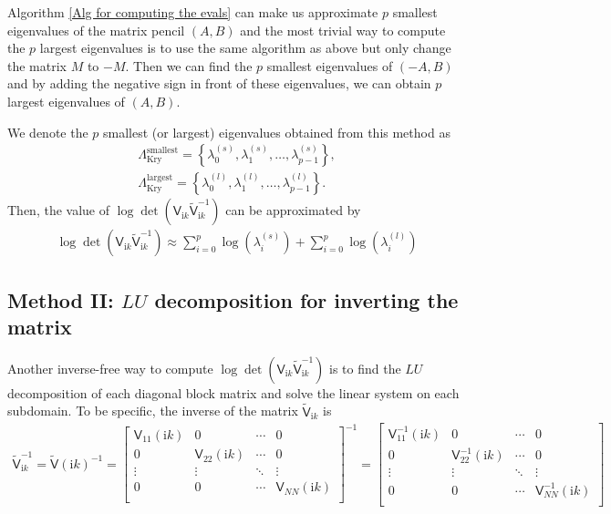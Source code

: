 Algorithm \ref{Alg for computing the evals} can make us approximate $p$ smallest eigenvalues of the matrix pencil $(A,B)$ and the most trivial way to compute 
the $p$ largest eigenvalues is to use the same algorithm as above but only change the matrix $M$ to $-M$. Then we can find the $p$ smallest eigenvalues of 
$(-A, B)$ and by adding the negative sign in front of these eigenvalues, we can obtain $p$ largest eigenvalues of $(A, B)$.

We denote the $p$ smallest (or largest) eigenvalues obtained from this method as 
\begin{align}
    \Lambda_{\text{Kry}}^{\text{smallest}} = \left\{\lambda_{0}^{(s)}, \lambda_{1}^{(s)}, \dots, \lambda_{p-1}^{(s)}\right\},\label{smallest Eigevalues in Krylov}\\
    \Lambda_{\text{Kry}}^{\text{largest}} = \left\{\lambda_{0}^{(l)}, \lambda_{1}^{(l)}, \dots, \lambda_{p-1}^{(l)}\right\}. \label{largest Eigevalues in Krylov}
\end{align}
Then, the value of  $\log\det(\mathsf{V}_{\mathrm{i}k}\tilde{\mathsf{V}}_{\mathrm{i}k}^{-1})$ can be approximated by 
\begin{align*}
    \log\det(\mathsf{V}_{\mathrm{i}k}\tilde{\mathsf{V}}_{\mathrm{i}k}^{-1}) \approx \sum_{i = 0}^{p} \log\left(\lambda_{i}^{(s)}\right) + \sum_{i = 0}^{p} \log\left(\lambda_{i}^{(l)}\right)
\end{align*}

\subsection{Method II: $LU$ decomposition for inverting the matrix}
Another inverse-free way to compute $\log\det(\mathsf{V}_{\mathrm{i}k}\tilde{\mathsf{V}}_{\mathrm{i}k}^{-1})$ is to find the $LU$ decomposition of 
each diagonal block matrix and solve the linear system on each subdomain. To be specific, the inverse of the matrix $\tilde{\mathsf{V}}_{\mathrm{i}k}$ is
\begin{align*}
    \tilde{\mathsf{V}}_{\mathrm{i}k}^{-1} =  \tilde{\mathsf{V}}(\mathrm{i}k)^{-1} = \begin{bmatrix}
        \mathsf{V}_{11}(\mathrm{i}k) & 0      & \cdots & 0 \\
    0      & \mathsf{V}_{22}(\mathrm{i}k) & \cdots & 0\\
    \vdots & \vdots & \ddots & \vdots \\
    0      & 0      & \cdots & \mathsf{V}_{NN}(\mathrm{i}k) \\
\end{bmatrix}^{-1}
= \begin{bmatrix}
    \mathsf{V}_{11}^{-1}(\mathrm{i}k) & 0      & \cdots & 0 \\
0      & \mathsf{V}_{22}^{-1}(\mathrm{i}k) & \cdots & 0\\
\vdots & \vdots & \ddots & \vdots \\
0      & 0      & \cdots & \mathsf{V}_{NN}^{-1} (\mathrm{i}k)\\
\end{bmatrix}
\end{align*}

